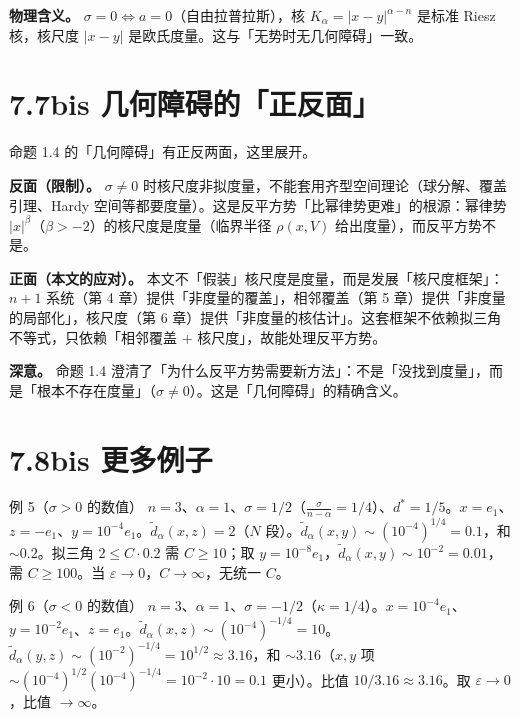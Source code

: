 \documentclass[a4paper,11pt,openany]{ctexbook}
\numberwithin{equation}{chapter}
\numberwithin{figure}{chapter}
\numberwithin{table}{chapter}
\begin{document}
\textbf{物理含义。} $\sigma=0\iff a=0$（自由拉普拉斯），核 $K_\alpha=|x-y|^{\alpha-n}$ 是标准 Riesz 核，核尺度 $|x-y|$ 是欧氏度量。这与「无势时无几何障碍」一致。

\section{7.7bis 几何障碍的「正反面」}

命题 1.4 的「几何障碍」有正反两面，这里展开。

\textbf{反面（限制）。} $\sigma\neq0$ 时核尺度非拟度量，不能套用齐型空间理论（球分解、覆盖引理、Hardy 空间等都要度量）。这是反平方势「比幂律势更难」的根源：幂律势 $|x|^\beta$（$\beta>-2$）的核尺度是度量（临界半径 $\rho(x,V)$ 给出度量），而反平方势不是。

\textbf{正面（本文的应对）。} 本文不「假装」核尺度是度量，而是发展「核尺度框架」：$n+1$ 系统（第 4 章）提供「非度量的覆盖」，相邻覆盖（第 5 章）提供「非度量的局部化」，核尺度（第 6 章）提供「非度量的核估计」。这套框架不依赖拟三角不等式，只依赖「相邻覆盖 + 核尺度」，故能处理反平方势。

\textbf{深意。} 命题 1.4 澄清了「为什么反平方势需要新方法」：不是「没找到度量」，而是「根本不存在度量」（$\sigma\neq0$）。这是「几何障碍」的精确含义。

\section{7.8bis 更多例子}

\begin{examplebox}{例 5（$\sigma>0$ 的数值）}
$n=3$、$\alpha=1$、$\sigma=1/2$（$\frac{\sigma}{n-\alpha}=1/4$）、$d^*=1/5$。$x=e_1$、$z=-e_1$、$y=10^{-4}e_1$。$\widetilde d_\alpha(x,z)=2$（$N$ 段）。$\widetilde d_\alpha(x,y)\sim(10^{-4})^{1/4}=0.1$，和 $\sim0.2$。拟三角 $2\le C\cdot0.2$ 需 $C\ge10$；取 $y=10^{-8}e_1$，$\widetilde d_\alpha(x,y)\sim10^{-2}=0.01$，需 $C\ge100$。当 $\varepsilon\to0$，$C\to\infty$，无统一 $C$。
\end{examplebox}

\begin{examplebox}{例 6（$\sigma<0$ 的数值）}
$n=3$、$\alpha=1$、$\sigma=-1/2$（$\kappa=1/4$）。$x=10^{-4}e_1$、$y=10^{-2}e_1$、$z=e_1$。$\widetilde d_\alpha(x,z)\sim(10^{-4})^{-1/4}=10$。$\widetilde d_\alpha(y,z)\sim(10^{-2})^{-1/4}=10^{1/2}\approx3.16$，和 $\sim3.16$（$x,y$ 项 $\sim(10^{-4})^{1/2}(10^{-4})^{-1/4}=10^{-2}\cdot10=0.1$ 更小）。比值 $10/3.16\approx3.16$。取 $\varepsilon\to0$，比值 $\to\infty$。
\end{examplebox}
\end{document}

